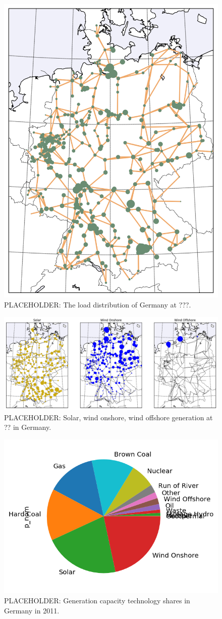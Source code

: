 \documentclass[main.tex]{subfiles}
\begin{document}
\begin{figure}
    \centering
    \includegraphics[width=.4\textwidth]{img/load.png}
    \caption{PLACEHOLDER: The load distribution of Germany at ???.}
    \label{fig:loaddistribution}
\end{figure}
\begin{figure}
    \centering
    \includegraphics[width=\textwidth]{img/solarwind.png}
    \caption{PLACEHOLDER: Solar, wind onshore, wind offshore generation at ?? in Germany.}
    \label{fig:solarwind}
\end{figure}
\begin{figure}
    \centering
    \includegraphics[width=.4\textwidth]{img/genprop.png}
    \caption{PLACEHOLDER: Generation capacity technology shares in Germany in 2011.}
    \label{fig:generationtech}
\end{figure}
\end{document}

